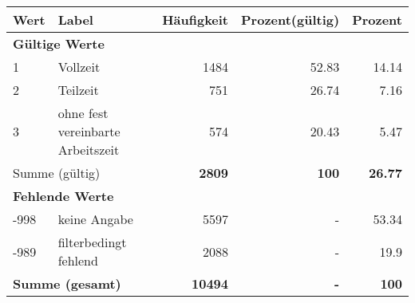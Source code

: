      \begin{longtable}{lXrrr}
     \toprule
     \textbf{Wert} & \textbf{Label} & \textbf{Häufigkeit} & \textbf{Prozent(gültig)} & \textbf{Prozent} \\
     \endhead
     \midrule
     \multicolumn{5}{l}{\textbf{Gültige Werte}}\\

     1 &
     \multicolumn{1}{X}{ Vollzeit   } &


       \num{1484} &
       \num[round-mode=places,round-precision=2]{52.83} &
         \num[round-mode=places,round-precision=2]{14.14} \\

     2 &
     \multicolumn{1}{X}{ Teilzeit   } &


       \num{751} &
       \num[round-mode=places,round-precision=2]{26.74} &
         \num[round-mode=places,round-precision=2]{7.16} \\

     3 &
     \multicolumn{1}{X}{ ohne fest vereinbarte Arbeitszeit   } &


       \num{574} &
       \num[round-mode=places,round-precision=2]{20.43} &
         \num[round-mode=places,round-precision=2]{5.47} \\
     \midrule
     \multicolumn{2}{l}{Summe (gültig)} &
       \textbf{\num{2809}} &
     \textbf{\num{100}} &
       \textbf{\num[round-mode=places,round-precision=2]{26.77}} \\
     \multicolumn{5}{l}{\textbf{Fehlende Werte}}\\
       -998 &
       keine Angabe &
         \num{5597} &
        - &
         \num[round-mode=places,round-precision=2]{53.34} \\
       -989 &
       filterbedingt fehlend &
         \num{2088} &
        - &
         \num[round-mode=places,round-precision=2]{19.9} \\
     \midrule
     \multicolumn{2}{l}{\textbf{Summe (gesamt)}} &
          \textbf{\num{10494}} &
        \textbf{-} &
        \textbf{\num{100}} \\
     \bottomrule
     \end{longtable}
     
